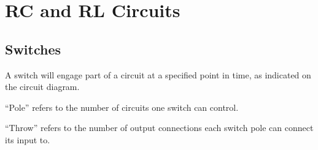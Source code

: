\documentclass{article}
\begin{document}
\section{RC and RL Circuits}
\subsection{Switches}
\begin{definition}
    A switch will engage part of a circuit at a specified point in time, as indicated
    on the circuit diagram.
\end{definition}
\begin{definition}[Poles]
    ``Pole'' refers to the number of circuits one switch can control.
\end{definition}
\begin{definition}[Throw]
    ``Throw'' refers to the number of output connections each switch
    pole can connect its input to.
\end{definition}
\end{document}
